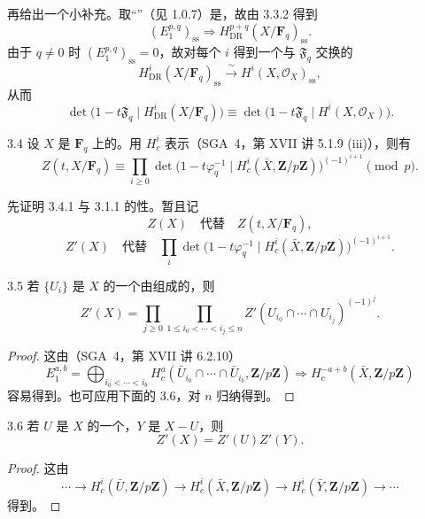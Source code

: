 再给出一个小补充。取“”（见 1.0.7）是，故由 3.3.2 得到
\[
(E_1^{p,q})_{\mathrm{ss}}\Longrightarrow
H^{p+q}_{\mathrm{DR}}(X/\mathbf F_q)_{\mathrm{ss}}. \tag{3.3.3}
\]
由于 $q\ne0$ 时 $(E_1^{p,q})_{\mathrm{ss}}=0$，故对每个 $i$ 得到一个与 $\mathfrak F_q$ 交换的
\[
H^i_{\mathrm{DR}}(X/\mathbf F_q)_{\mathrm{ss}}
\xrightarrow{\ \sim\ }H^i(X,\mathcal O_X)_{\mathrm{ss}}, \tag{3.3.4}
\]
从而
\[
\det\bigl(1-t\mathfrak F_q\mid H^i_{\mathrm{DR}}(X/\mathbf F_q)\bigr)
\equiv\det\bigl(1-t\mathfrak F_q\mid H^i(X,\mathcal O_X)\bigr). \tag{3.3.5}
\]
\begin{SGAresult}{}{3.4}
设 $X$ 是 $\mathbf F_q$ 上的。用 $H_c^i$ 表示（SGA~4，第 XVII 讲 5.1.9 (iii)），则有
\[
Z(t,X/\mathbf F_q)\equiv
\prod_{i\geq0}\det\bigl(1-t\varphi_q^{-1}\mid
H_c^i(\bar X,\mathbf Z/p\mathbf Z)\bigr)^{(-1)^{i+1}}\pmod p. \tag{3.4.1}
\]
\end{SGAresult}
先证明 3.4.1 与 3.1.1 的性。暂且记
\[
Z(X)\quad\text{代替}\quad Z(t,X/\mathbf F_q), \tag{3.4.2}
\]
\[
Z'(X)\quad\text{代替}\quad
\prod_i\det\bigl(1-t\varphi_q^{-1}\mid
H_c^i(\bar X,\mathbf Z/p\mathbf Z)\bigr)^{(-1)^{i+1}}. \tag{3.4.3}
\]
\begin{SGAresult}{}{3.5}
若 $\{U_i\}$ 是 $X$ 的一个由组成的，则
\[
Z'(X)=\prod_{j\geq0}\prod_{1\leq i_0<\cdots<i_j\leq n}
Z'(U_{i_0}\cap\cdots\cap U_{i_j})^{(-1)^j}. \tag{3.5.1}
\]
\end{SGAresult}
\begin{proof}
这由（SGA~4，第 XVII 讲 6.2.10）
\[
E_1^{a,b}=\bigoplus_{i_0<\cdots<i_b}
H_c^a(\bar U_{i_0}\cap\cdots\cap\bar U_{i_b},\mathbf Z/p\mathbf Z)
\Longrightarrow H_c^{-a+b}(\bar X,\mathbf Z/p\mathbf Z)
\]
容易得到。也可应用下面的 3.6，对 $n$ 归纳得到。
\end{proof}
\begin{SGAresult}{}{3.6}
若 $U$ 是 $X$ 的一个，$Y$ 是 $X-U$，则
\[
Z'(X)=Z'(U)Z'(Y). \tag{3.6.1}
\]
\end{SGAresult}
\begin{proof}
这由
\[
\cdots\longrightarrow H_c^i(\bar U,\mathbf Z/p\mathbf Z)
\longrightarrow H_c^i(\bar X,\mathbf Z/p\mathbf Z)
\longrightarrow H_c^i(\bar Y,\mathbf Z/p\mathbf Z)
\longrightarrow\cdots \tag{3.6.2}
\]
得到。
\end{proof}
